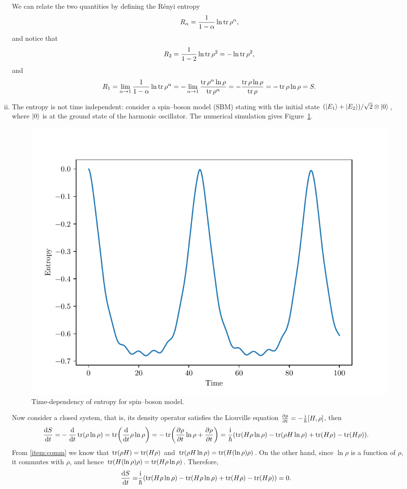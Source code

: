 \documentclass{article}
\newcommand{\iu}{\ensuremath{\mathrm{i}}}
\begin{document}
\begin{enumerate}[1.]
\begin{enumerate}[(i)]
    We can relate the two quantities by defining the R\'enyi entropy
    \begin{align*}
      R_\alpha = \frac{1}{1-\alpha}\ln \tr\rho^\alpha,
    \end{align*}
    and notice that
    \begin{align*}
      R_2 = \frac{1}{1-2}\ln \tr\rho^2 = -\ln \tr\rho^2,
    \end{align*}
    and
    \begin{align*}
      R_1 = \lim_{\alpha \to 1} \frac{1}{1-\alpha}\ln \tr\rho^\alpha = - \lim_{\alpha \to 1} \frac{ \tr \rho^{\alpha}\ln \rho}{\tr \rho^\alpha} = - \frac{ \tr \rho\ln\rho}{\tr \rho} = -  \tr \rho\ln\rho= S.
    \end{align*}
    \item The entropy is not time independent: consider a spin--boson model (SBM) stating with the initial state $\qty(\ket{E_1} + \ket{E_2})/\sqrt{2}\otimes\ket{0}$, where $\ket{0}$ is at the ground state of the harmonic oscillator. The numerical simulation gives Figure~\ref{fig:q4-ce}.
    \begin{figure}[H]
      \centering
      \includegraphics[width=0.6\linewidth]{q4-ce.pdf}
      \caption{Time-dependency of entropy for spin--boson model.}
      \label{fig:q4-ce}
    \end{figure}

    Now consider a closed system, that is, its density operator satisfies the Liouville equation $\pdv{\rho}{t} = -\frac{\iu}{\hbar}\comm{H}{\rho}$, then
    \begin{align*}
      \dv{S}{t} =& - \dv{t} \tr(\rho \ln\rho) =  \tr(\dv{t}\rho \ln\rho)
      = -\tr(\pdv{\rho}{t}\ln\rho + \pdv{\rho}{t}) = \frac{\iu}{\hbar}\qty(\tr(H\rho\ln\rho) - \tr(\rho H \ln\rho) + \tr(H\rho) - \tr(H\rho)).
    \end{align*}
    From \ref{item:comm} we know that $\tr(\rho H) = \tr(H\rho)$ and $\tr(\rho H \ln\rho) = \tr(H (\ln\rho)\rho)$. On the other hand, since $\ln \rho$ is a function of $\rho$, it commutes with $\rho$, and hence $\tr(H (\ln\rho)\rho) = \tr(H\rho\ln\rho)$.
    Therefore,
    \begin{align*}
      \dv{S}{t} =& \frac{\iu}{\hbar}\qty(\tr(H\rho\ln\rho) - \tr(H\rho\ln\rho) + \tr(H\rho) -  \tr(H\rho)) = 0.
    \end{align*}
  \end{enumerate}


\end{enumerate}
\end{document}
